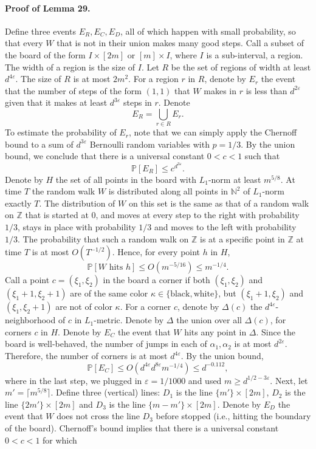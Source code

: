 \documentclass[10pt,a4paper]{article}
\begin{document}
\paragraph{Proof of Lemma 29.} Define three events $E_R,E_C,E_D$, all of which happen with small probability, so that every $W$ that is not in their union makes many good steps.
Call a subset of the board of the form $I\times[2m]$ or $[m]\times I$, where $I$ is a sub-interval, a region. The width of a region is the size of $I$. Let $R$ be the set of regions of width at least $d^{4\varepsilon}$. The size of $R$ is at most $2m^2$. For a region $r$ in $R$, denote by $E_r$ the event that the number of steps of the form $(1,1)$ that $W$ makes in $r$ is less than $d^{2\varepsilon}$ given that it makes at least $d^{3\varepsilon}$ steps in $r$. Denote
\[E_R=\bigcup_{r\in R}E_r.\]
To estimate the probability of $E_r$, note that we can simply apply the Chernoff bound to a sum of $d^{3\varepsilon}$ Bernoulli random variables with $p=1/3$. By the union bound, we conclude that there is a universal constant $0<c<1$ such that
\[\mathbb P[E_R]\leq c^{d^{3\varepsilon}}.\]
Denote by $H$ the set of all points in the board with $L_1$-norm at least $m^{5/8}$. At time $T$ the random walk $W$ is distributed along all points in $\mathbb N^2$ of $L_1$-norm exactly $T$. The distribution of $W$ on this set is the same as that of a random walk on $\mathbb Z$ that is started at $0$, and moves at every step to the right with probability $1/3$, stays in place with probability $1/3$ and moves to the left with probability $1/3$. The probability that such a random walk on $\mathbb Z$ is at a specific point in $\mathbb Z$ at time $T$ is at most $O(T^{-1/2})$. Hence, for every point $h$ in $H$,
\[\mathbb P[W\text{ hits }h]\leq O(m^{-5/16})\leq m^{-1/4}.\]
Call a point $c=(\xi_1,\xi_2)$ in the board a corner if both $(\xi_1,\xi_2)$ and $(\xi_1+1,\xi_2+1)$ are of the same color $\kappa\in\{\text{black},\text{white}\}$, but $(\xi_1+1,\xi_2)$ and $(\xi_1,\xi_2+1)$ are not of color $\kappa$. For a corner $c$, denote by $\Delta(c)$ the $d^{4\varepsilon}$-neighborhood of $c$ in $L_1$-metric. Denote by $\Delta$ the union over all $\Delta(c)$, for corners $c$ in $H$. Denote by $E_C$ the event that $W$ hits any point in $\Delta$. Since the board is well-behaved, the number of jumps in each of $\alpha_1,\alpha_2$ is at most $d^{2\varepsilon}$. Therefore, the number of corners is at most $d^{4\varepsilon}$. By the union bound,
\[\mathbb P[E_C]\leq O(d^{4\varepsilon}d^{8\varepsilon}m^{-1/4})\leq d^{-0.112},\]
where in the last step, we plugged in $\varepsilon=1/1000$ and used $m\geq d^{1/2-3\varepsilon}$. Next, let $m'=\lceil m^{5/8}\rceil$. Define three (vertical) lines: $D_1$ is the line $\{m'\}\times[2m]$, $D_2$ is the line $\{2m'\}\times[2m]$ and $D_3$ is the line $\{m-m'\}\times[2m]$. Denote by $E_D$ the event that $W$ does not cross the line $D_3$ before stopped (i.e., hitting the boundary of the board). Chernoff's bound implies that there is a universal constant $0<c<1$ for which
\end{document}
